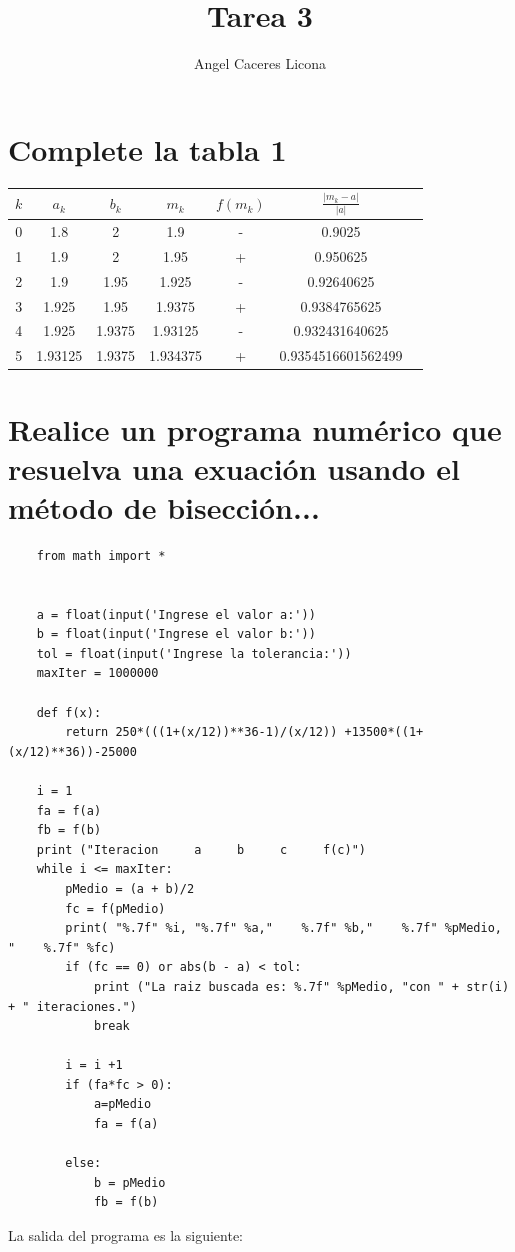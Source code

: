 \documentclass{article}
\begin{document}
\title{Tarea 3}
\author{Angel Caceres Licona}

\maketitle


\section{Complete la tabla 1}

\begin{center}
    \begin{tabular}{||c c c c c c c||} 
    \hline
    $k$ & $a_k$ & $b_k$ & $m_k$ & $f(m_k)$ & $\frac{|m_k - a|}{|a|}$ \\ [0.5ex] 
    \hline\hline
    0 & 1.8 & 2 & 1.9 & - & 0.9025 \\ 
    \hline
    1 & 1.9 & 2 & 1.95 & + & 0.950625 \\
    \hline
    2 & 1.9 & 1.95 & 1.925 & - & 0.92640625\\
    \hline
    3 & 1.925 & 1.95 & 1.9375 & + & 0.9384765625\\
    \hline
    4 & 1.925 & 1.9375 & 1.93125 & - & 0.932431640625\\
    \hline 
    5 & 1.93125 & 1.9375 & 1.934375 & + & 0.9354516601562499\\ 
    \hline 
   \end{tabular}
\end{center}

\section{Realice un programa numérico que resuelva una exuación usando el método de bisección...}

\begin{lstlisting}
    from math import *
 

    a = float(input('Ingrese el valor a:'))
    b = float(input('Ingrese el valor b:'))
    tol = float(input('Ingrese la tolerancia:'))
    maxIter = 1000000
     
    def f(x):
        return 250*(((1+(x/12))**36-1)/(x/12)) +13500*((1+(x/12)**36))-25000
     
    i = 1
    fa = f(a)
    fb = f(b)
    print ("Iteracion     a     b     c     f(c)")
    while i <= maxIter:
        pMedio = (a + b)/2
        fc = f(pMedio)
        print( "%.7f" %i, "%.7f" %a,"    %.7f" %b,"    %.7f" %pMedio, "    %.7f" %fc)
        if (fc == 0) or abs(b - a) < tol:
            print ("La raiz buscada es: %.7f" %pMedio, "con " + str(i) + " iteraciones.")
            break
        
        i = i +1
        if (fa*fc > 0):
            a=pMedio
            fa = f(a)
    
        else:
            b = pMedio
            fb = f(b)
\end{lstlisting}
La salida del programa es la siguiente: 
\end{document}

